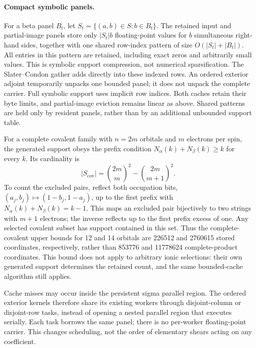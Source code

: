 \documentclass[11pt,a4paper]{article}
\begin{document}
\paragraph{Compact symbolic panels.}
For a beta panel $B_t$, let
$S_t=\{(a,b)\in S:b\in B_t\}$.
The retained input and partial-image panels store only $|S_t|b$
floating-point values for $b$ simultaneous right-hand sides, together with
one shared row-index pattern of size $O(|S_t|+|B_t|)$. All entries in this
pattern are retained, including exact zeros and arbitrarily small values.
This is symbolic support compression, not numerical sparsification.
The Slater--Condon gather adds directly into these indexed rows. An ordered
exterior adjoint temporarily unpacks one bounded panel; it does not unpack
the complete carrier. Full symbolic support uses implicit row indices.
Both caches retain their byte limits, and partial-image eviction remains
linear as above. Shared patterns are held only by resident panels, rather
than by an additional unbounded support table.

For a complete covalent family with $n=2m$ orbitals and $m$ electrons per
spin, the generated support obeys the prefix condition
$N_\alpha(k)+N_\beta(k)\geq k$ for every $k$.
Its cardinality is
\begin{equation}
 |S_{\mathrm{cov}}|=
 \binom{2m}{m}^{\!2}-\binom{2m}{m+1}^{\!2}.
 \label{eq:covalent-panel-count}
\end{equation}
To count the excluded pairs, reflect both occupation bits,
$(a_j,b_j)\mapsto(1-b_j,1-a_j)$, up to the first prefix with
$N_\alpha(k)+N_\beta(k)=k-1$. This maps an excluded pair bijectively to
two strings with $m+1$ electrons; the inverse reflects up to the first
prefix excess of one. Any selected covalent subset has support contained
in this set. Thus the complete-covalent upper bounds for 12 and 14 orbitals
are 226512 and 2760615 stored coordinates, respectively, rather than
853776 and 11778624 complete-product coordinates. This bound does not
apply to arbitrary ionic selections: their own generated support determines
the retained count, and the same bounded-cache algorithm still applies.

Cache misses may occur inside the persistent sigma parallel region.
The ordered exterior kernels therefore share its existing workers through
disjoint-column or disjoint-row tasks, instead of opening a nested parallel
region that executes serially. Each task borrows the same panel; there is
no per-worker floating-point carrier. This changes scheduling, not the
order of elementary shears acting on any coefficient.
\end{document}
